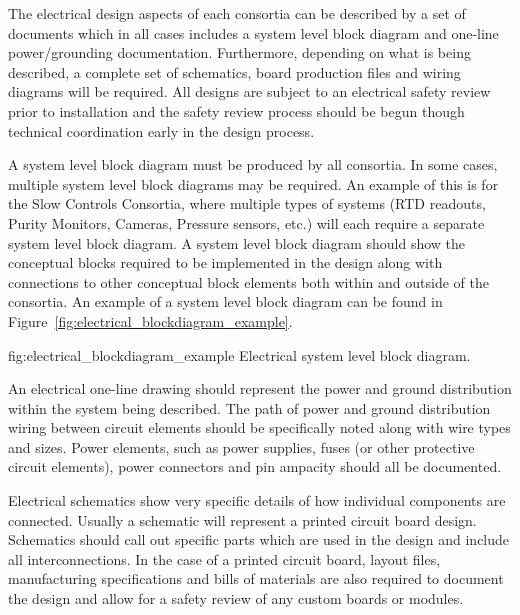 The electrical design aspects of each consortia can be described by a
set of documents which in all cases includes a system level block
diagram and one-line power/grounding documentation.  Furthermore,
depending on what is being described, a complete set of schematics,
board production files and wiring diagrams will be required.  All
designs are subject to an electrical safety review prior to
installation and the safety review process should be begun though
technical coordination early in the design process.

A system level block diagram must be produced by all consortia.
 In
some cases, multiple system level block diagrams may be required.  An
example of this is for the Slow Controls Consortia, where multiple
types of systems (RTD readouts, Purity Monitors, Cameras, Pressure
sensors, etc.) will each require a separate system level block
diagram. A system level block diagram should show the conceptual
blocks required to be implemented in the design along with connections
to other conceptual block elements both within and outside of the
consortia.  An example of a system level block diagram can be found in
Figure~\ref{fig:electrical_blockdiagram_example}.
\begin{dunefigure}{fig:electrical_blockdiagram_example}
  {Electrical system level block diagram.}
\end{dunefigure}

An electrical one-line drawing should represent the power and ground
distribution within the system being described.  The path of power and
ground distribution wiring between circuit elements should be
specifically noted along with wire types and sizes.  Power elements,
such as power supplies, fuses (or other protective circuit elements),
power connectors and pin ampacity should all be documented.

Electrical schematics show very specific details of how individual
components are connected.  Usually a schematic will represent a
printed circuit board design.  Schematics should call out specific
parts which are used in the design and include all interconnections.
In the case of a printed circuit board, layout files, manufacturing
specifications and bills of materials are also required to document
the design and allow for a safety review of any custom boards or
modules.

